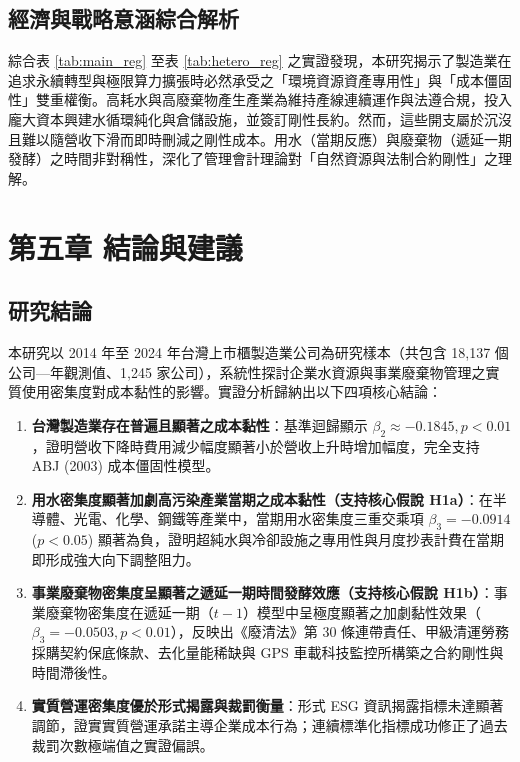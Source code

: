 \documentclass[12pt,a4paper]{article}
\begin{document}
\subsection{經濟與戰略意涵綜合解析}

綜合表 \ref{tab:main_reg} 至表 \ref{tab:hetero_reg} 之實證發現，本研究揭示了製造業在追求永續轉型與極限算力擴張時必然承受之「環境資源資產專用性」與「成本僵固性」雙重權衡。高耗水與高廢棄物產生產業為維持產線連續運作與法遵合規，投入龐大資本興建水循環純化與倉儲設施，並簽訂剛性長約。然而，這些開支屬於沉沒且難以隨營收下滑而即時刪減之剛性成本。用水（當期反應）與廢棄物（遞延一期發酵）之時間非對稱性，深化了管理會計理論對「自然資源與法制合約剛性」之理解。

\newpage

\section{第五章 結論與建議}

\subsection{研究結論}

本研究以 2014 年至 2024 年台灣上市櫃製造業公司為研究樣本（共包含 18,137 個公司—年觀測值、1,245 家公司），系統性探討企業水資源與事業廢棄物管理之實質使用密集度對成本黏性的影響。實證分析歸納出以下四項核心結論：

\begin{enumerate}[leftmargin=*]
    \item \textbf{台灣製造業存在普遍且顯著之成本黏性}：基準迴歸顯示 $\beta_2 \approx -0.1845, p < 0.01$，證明營收下降時費用減少幅度顯著小於營收上升時增加幅度，完全支持 ABJ (2003) 成本僵固性模型。
    \item \textbf{用水密集度顯著加劇高污染產業當期之成本黏性（支持核心假說 H1a）}：在半導體、光電、化學、鋼鐵等產業中，當期用水密集度三重交乘項 $\beta_3 = -0.0914$ ($p < 0.05$) 顯著為負，證明超純水與冷卻設施之專用性與月度抄表計費在當期即形成強大向下調整阻力。
    \item \textbf{事業廢棄物密集度呈顯著之遞延一期時間發酵效應（支持核心假說 H1b）}：事業廢棄物密集度在遞延一期（$t-1$）模型中呈極度顯著之加劇黏性效果（$\beta_3 = -0.0503, p < 0.01$），反映出《廢清法》第 30 條連帶責任、甲級清運勞務採購契約保底條款、去化量能稀缺與 GPS 車載科技監控所構築之合約剛性與時間滯後性。
    \item \textbf{實質營運密集度優於形式揭露與裁罰衡量}：形式 ESG 資訊揭露指標未達顯著調節，證實實質營運承諾主導企業成本行為；連續標準化指標成功修正了過去裁罰次數極端值之實證偏誤。
\end{enumerate}
\end{document}
